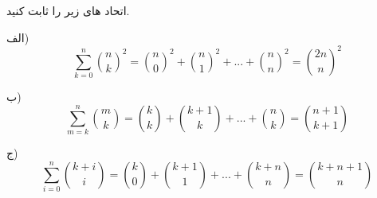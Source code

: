 \exercise
اتحاد های زیر را ثابت کنید.

الف)
$$\sum_{k=0}^{n}\binom n k ^2 = \binom n 0 ^2 + \binom n 1 ^2 + ... + \binom n n ^2 = \binom {2n}{n} ^2$$

ب)
$$\sum_{m=k}^{n}\binom m k = \binom {k}{k} + \binom {k+1}{k} + ... + \binom {n}{k} = \binom {n+1}{k+1}$$

ج)
$$\sum_{i=0}^{n}\binom {k+i}{i} = \binom {k}{0} + \binom {k+1}{1} + ... + \binom {k+n}{n} = \binom {k+n+1}{n}$$
